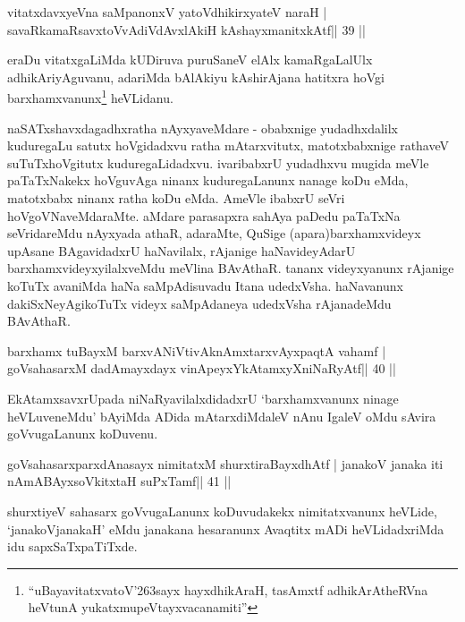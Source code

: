 \begin{shl}
vitatxdavxyeVna saMpanonxV yatoV\s dhikirxyateV naraH |
savaRkamaRsavxtoV\s vAdiVdAvxlAkiH kAshayxmanitxkAtf\hfill || 39 ||
\end{shl}

\begin{artha}
eraDu vitatxgaLiMda kUDiruva puruSaneV elAlx kamaRgaLalUlx adhikAriyAguvanu, adariMda bAlAkiyu kAshirAjana hatitxra hoVgi barxhamxvanunx\footnote[8]{``uBayavitatxvatoV\char'263sayx hayxdhikAraH, tasAmxtf adhikArAtheRVna heVtunA yukatxmupeVtayxvacanamiti''} heVLidanu.
\end{artha}

\begin{artha}
naSATxshavxdagadhxratha nAyxyaveMdare - obabxnige yudadhxdalilx 
kuduregaLu satutx hoVgidadxvu ratha mAtarxvitutx, matotxbabxnige 
rathaveV suTuTxhoVgitutx kuduregaLidadxvu. ivaribabxrU yudadhxvu mugida 
meVle paTaTxNakekx hoVguvAga ninanx kuduregaLanunx nanage koDu eMda, 
matotxbabx ninanx ratha koDu eMda. AmeVle ibabxrU seVri 
hoVgoVNaveMdaraMte. aMdare parasapxra sahAya paDedu paTaTxNa 
seVridareMdu nAyxyada athaR, adaraMte, QuSige (apara)barxhamxvideyx upAsane BAgavidadxrU haNavilalx, rAjanige haNavideyAdarU barxhamxvideyxyilalxveMdu meVlina BAvAthaR. tananx videyxyanunx rAjanige koTuTx avaniMda haNa saMpAdisuvadu Itana udedxVsha. haNavanunx dakiSxNeyAgikoTuTx videyx saMpAdaneya udedxVsha rAjanadeMdu BAvAthaR.
\end{artha}


\begin{shl}
barxhamx tuBayxM barxvANiVtivAknAmxtarxvAyxpaqtA vahamf |
goVsahasarxM dadAmayxdayx vinApeyxYkAtamxyXniNaRyAtf\hfill || 40 ||
\end{shl}

\begin{artha}
EkAtamxsavxrUpada niNaRyavilalxdidadxrU `barxhamxvanunx ninage 
heVLuveneMdu' bAyiMda ADida mAtarxdiMdaleV nAnu IgaleV oMdu sAvira goVvugaLanunx koDuvenu.
\end{artha}

\begin{shl}
goVsahasarxparxdAnasayx nimitatxM shurxtiraBayxdhAtf |
janakoV janaka iti nAmABAyxsoVkitxtaH suPxTamf\hfill || 41 ||
\end{shl}

\begin{artha}
shurxtiyeV sahasarx goVvugaLanunx koDuvudakekx nimitatxvanunx heVLide, 
`janakoVjanakaH' eMdu janakana hesaranunx Avaqtitx mADi heVLidadxriMda idu sapxSaTxpaTiTxde.
\end{artha}

